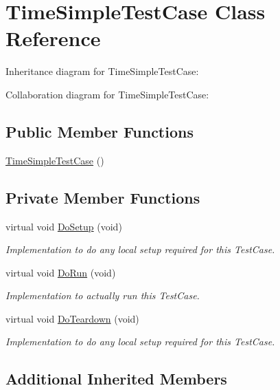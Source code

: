 \hypertarget{classTimeSimpleTestCase}{}\section{Time\+Simple\+Test\+Case Class Reference}
\label{classTimeSimpleTestCase}


Inheritance diagram for Time\+Simple\+Test\+Case\+:


Collaboration diagram for Time\+Simple\+Test\+Case\+:
\subsection*{Public Member Functions}
\begin{DoxyCompactItemize}
\item 
\hyperlink{classTimeSimpleTestCase_a52fb90472b315389968dd074edfd653e}{Time\+Simple\+Test\+Case} ()
\end{DoxyCompactItemize}
\subsection*{Private Member Functions}
\begin{DoxyCompactItemize}
\item 
virtual void \hyperlink{classTimeSimpleTestCase_a5000b4f65674ef8b5265353ae099cd21}{Do\+Setup} (void)
\begin{DoxyCompactList}\small\item\em Implementation to do any local setup required for this Test\+Case. \end{DoxyCompactList}\item 
virtual void \hyperlink{classTimeSimpleTestCase_a4420daddc0f37503638626397ec83f41}{Do\+Run} (void)
\begin{DoxyCompactList}\small\item\em Implementation to actually run this Test\+Case. \end{DoxyCompactList}\item 
virtual void \hyperlink{classTimeSimpleTestCase_a6cbd553f78355557fed4ca5cc7d81402}{Do\+Teardown} (void)
\begin{DoxyCompactList}\small\item\em Implementation to do any local setup required for this Test\+Case. \end{DoxyCompactList}\end{DoxyCompactItemize}
\subsection*{Additional Inherited Members}


